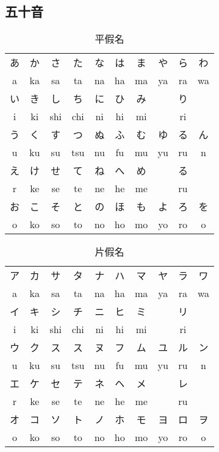\documentclass[12pt]{article}
\begin{document}
\begin{CJK}{UTF8}{cybercjk}
\renewcommand{\contentsname}{目錄}
\renewcommand{\tablename}{表}
\renewcommand{\figurename}{圖}
\renewcommand{\listtablename}{表格目錄}
\renewcommand{\listfigurename}{圖目錄}

\tableofcontents
\newpage


\section{五十音}

\begin{table}[htdp]
\caption{平假名}
\begin{tabular}{cccccccccc}
\hline
あ& か & さ & た & な & は & ま & や & ら & わ\\
a & ka & sa & ta & na & ha & ma& ya & ra & wa\\
\hline
い & き & し & ち & に & ひ & み & & り& \\
i & ki & shi & chi & ni & hi & mi & & ri& \\
\hline
う & く  & す & つ & ぬ & ふ & む & ゆ & る & ん\\	
 u & ku &  su &  tsu &  nu &  fu &  mu &  yu &  ru & n\\	
\hline
え & け & せ & て & ね & へ & め & & る & \\	
 r & ke &  se &  te &  ne &  he &  me & &  ru & \\	
\hline
お & こ  & そ & と & の & ほ & も & よ & ろ & を\\	
 o &  ko &  so &  to &  no &  ho &  mo &  yo &  ro & o\\	

\hline
\end{tabular}
\end{table}


\begin{table}[htdp]
\caption{片假名}
\begin{tabular}{cccccccccc}
\hline
ア& カ & サ & タ & ナ & ハ & マ & ヤ & ラ & ワ\\
a & ka & sa & ta & na & ha & ma& ya & ra & wa\\
\hline
イ& キ & シ & チ & ニ & ヒ & ミ &  & リ & \\
i & ki & shi & chi & ni & hi & mi & & ri& \\
\hline
ウ& ク & ス & ス & ヌ & フ & ム & ユ & ル & ン\\
 u & ku &  su &  tsu &  nu &  fu &  mu &  yu &  ru & n\\	
\hline
エ& ケ & セ & テ & ネ & ヘ & メ & & レ & \\
 r & ke &  se &  te &  ne &  he &  me & &  ru & \\	
\hline
オ& コ & ソ & ト & ノ & ホ & モ & ヨ & ロ & ヲ\\
 o &  ko &  so &  to &  no &  ho &  mo &  yo &  ro & o\\	


\end{tabular}
\end{table}
\end{CJK}
\end{document}
